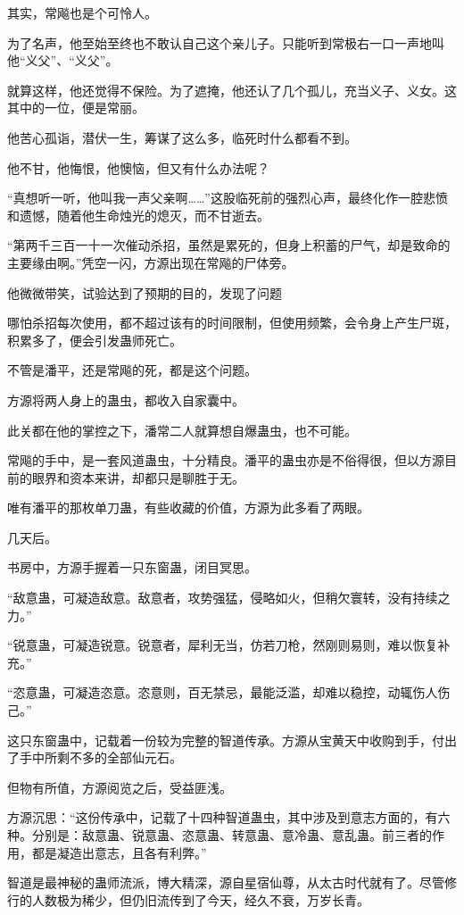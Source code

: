 \begin{this_body}
其实，常飚也是个可怜人。

为了名声，他至始至终也不敢认自己这个亲儿子。只能听到常极右一口一声地叫他“义父”、“义父”。

就算这样，他还觉得不保险。为了遮掩，他还认了几个孤儿，充当义子、义女。这其中的一位，便是常丽。

他苦心孤诣，潜伏一生，筹谋了这么多，临死时什么都看不到。

他不甘，他悔恨，他懊恼，但又有什么办法呢？

“真想听一听，他叫我一声父亲啊……”这股临死前的强烈心声，最终化作一腔悲愤和遗憾，随着他生命烛光的熄灭，而不甘逝去。

“第两千三百一十一次催动杀招，虽然是累死的，但身上积蓄的尸气，却是致命的主要缘由啊。”凭空一闪，方源出现在常飚的尸体旁。

他微微带笑，试验达到了预期的目的，发现了问题

哪怕杀招每次使用，都不超过该有的时间限制，但使用频繁，会令身上产生尸斑，积累多了，便会引发蛊师死亡。

不管是潘平，还是常飚的死，都是这个问题。

方源将两人身上的蛊虫，都收入自家囊中。

此关都在他的掌控之下，潘常二人就算想自爆蛊虫，也不可能。

常飚的手中，是一套风道蛊虫，十分精良。潘平的蛊虫亦是不俗得很，但以方源目前的眼界和资本来讲，却都只是聊胜于无。

唯有潘平的那枚单刀蛊，有些收藏的价值，方源为此多看了两眼。

几天后。

书房中，方源手握着一只东窗蛊，闭目冥思。

“敌意蛊，可凝造敌意。敌意者，攻势强猛，侵略如火，但稍欠寰转，没有持续之力。”

“锐意蛊，可凝造锐意。锐意者，犀利无当，仿若刀枪，然刚则易则，难以恢复补充。”

“恣意蛊，可凝造恣意。恣意则，百无禁忌，最能泛滥，却难以稳控，动辄伤人伤己。”

这只东窗蛊中，记载着一份较为完整的智道传承。方源从宝黄天中收购到手，付出了手中所剩不多的全部仙元石。

但物有所值，方源阅览之后，受益匪浅。

方源沉思：“这份传承中，记载了十四种智道蛊虫，其中涉及到意志方面的，有六种。分别是：敌意蛊、锐意蛊、恣意蛊、转意蛊、意冷蛊、意乱蛊。前三者的作用，都是凝造出意志，且各有利弊。”

智道是最神秘的蛊师流派，博大精深，源自星宿仙尊，从太古时代就有了。尽管修行的人数极为稀少，但仍旧流传到了今天，经久不衰，万岁长青。


\end{this_body}
